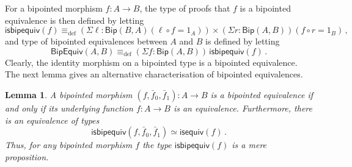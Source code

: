 \documentclass[10pt,a4paper,oneside,reqno]{amsart}
\numberwithin{equation}{section}
\theoremstyle{mythm}
\newtheorem{lemma}[theorem]{Lemma}
\theoremstyle{mydef}
\theoremstyle{myrmk}
\newcommand{\deq}{\equiv}
\newcommand{\defeq}{\deq_{\mathrm{def}}}
\newcommand{\co}{\colon}
\newcommand{\isequiv}{\mathsf{isequiv}}
\newcommand{\BipHom}{\mathsf{Bip}}
\newcommand{\isbipequiv}{\mathsf{isbipequiv}}
\newcommand{\BipEquiv}{\mathsf{BipEquiv}}
\begin{document}
For a bipointed morphism $f \co A \to B$, the type of proofs that $f$ is a bipointed equivalence is
then defined by letting
\[
\isbipequiv(f) \defeq   ( \Sigma \ell : \BipHom(B,A) ( \ell \circ f = 1_A )) \times 
    (\Sigma r : \BipHom(A, B))(  f \circ r = 1_B ) \, ,
\]
and type of bipointed equivalences between $A$ and $B$ is defined by letting
\[
\BipEquiv(A, B)
\defeq    
(\Sigma f : \BipHom(A,B)) \, \isbipequiv(f)  \, . 
\] 
Clearly, the identity morphism on a bipointed type is a bipointed equivalence. The next lemma
gives an alternative characterisation of bipointed equivalences.

\begin{lemma}\label{BoolAlgSpace}  \label{thm:usemere}
A bipointed morphism $(f, \bar{f}_0, \bar{f}_1) \co A \to B$ is a bipointed equivalence if and only
if its underlying function $f \co A \to B$ is an equivalence. Furthermore, there is an equivalence of types
\[
\isbipequiv(f, \bar{f}_0, \bar{f}_1)  \simeq \isequiv(f) \, . 
\]
Thus, for any bipointed morphism $f$ the type $\isbipequiv(f)$ is a mere proposition.
\end{lemma}  
\end{document}
